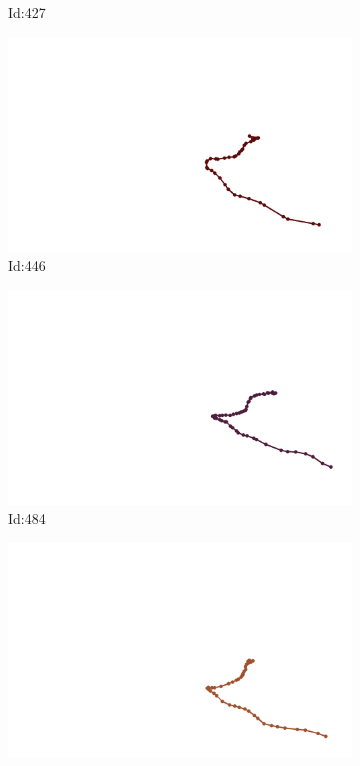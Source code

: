 \documentclass[12pt,twoside]{report}
\begin{document}
\begin{figure}
\begin{subfigure}[b]{0.20\textwidth}
\caption{Id:427}
\end{subfigure}
\begin{subfigure}[b]{0.20\textwidth}
\centering
\includegraphics[width=\textwidth]{../../trajectories/446.png}
\caption{Id:446}
\end{subfigure}
\begin{subfigure}[b]{0.20\textwidth}
\centering
\includegraphics[width=\textwidth]{../../trajectories/484.png}
\caption{Id:484}
\end{subfigure}
\begin{subfigure}[b]{0.20\textwidth}
\centering
\includegraphics[width=\textwidth]{../../trajectories/530.png}

\end{subfigure}
\end{figure}
\end{document}
